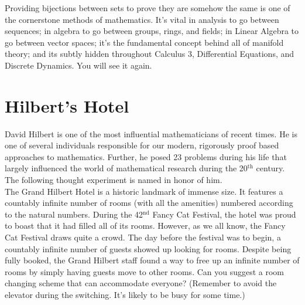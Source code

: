 Providing bijections between sets to prove they are somehow the same is one of the cornerstone methods of mathematics.  It's vital in analysis to go between sequences; in algebra to go between groups, rings, and fields; in Linear Algebra to go between vector spaces; it's the fundamental concept behind all of manifold theory; and its subtly hidden throughout Calculus 3, Differential Equations, and Discrete Dynamics.  You will see it again.
\newpage
\section{Hilbert's Hotel}

David Hilbert is one of the most influential mathematicians of recent times.  He is one of several individuals responsible for our modern, rigorously proof based approaches to mathematics.  Further, he posed 23 problems during his life that largely influenced the world of mathematical research during the 20$^{\text{th}}$ century.  The following thought experiment is named in honor of him.  \\

The Grand Hilbert Hotel is a historic landmark of immense size.  It features a countably infinite number of rooms (with all the amenities) numbered according to the natural numbers.  During the 42$^{\text{nd}}$ Fancy Cat Festival, the hotel was proud to boast that it had filled all of its rooms.  However, as we all know, the Fancy Cat Festival draws quite a crowd.  The day before the festival was to begin, a countably infinite number of guests showed up looking for rooms.  Despite being fully booked, the Grand Hilbert staff found a way to free up an infinite number of rooms by simply having guests move to other rooms.  Can you suggest a room changing scheme that can accommodate everyone?  (Remember to avoid the elevator during the switching.  It's likely to be busy for some time.)





